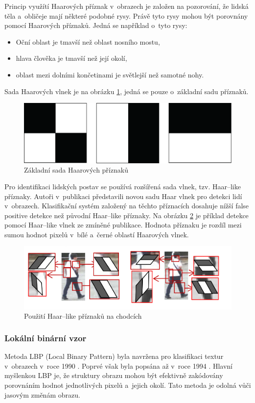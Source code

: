 Princip využítí Haarových příznak v~obrazech je založen na pozorování, že lidská těla a~obličeje mají některé podobné rysy. Právě tyto rysy mohou být porovnány pomocí Haarových příznaků. Jedná se například o~tyto rysy:
\begin{itemize}
  \item{Oční oblast je tmavší než oblast nosního mostu,}
  \item{hlava člověka je tmavší než její okolí,}
  \item{oblast mezi dolními končetinami je světlejší než samotné nohy.}
\end{itemize}
Sada Haarových vlnek je na obrázku \ref{fig:basichaarfeatures}, jedná se pouze o~základní sadu příznaků.
\begin{figure}[H]
\centering
\includegraphics[width=.7\linewidth]{figures/haar_features}
\caption{Základní sada Haarových příznaků}
\label{fig:basichaarfeatures}
\end{figure}

Pro identifikaci lidských postav se používá rozšířená sada vlnek, tzv. Haar--like příznaky. Autoři v~publikaci \cite{haar:like} představili novou sadu Haar vlnek pro detekci lidí v~obrazech. Klasifikační systém založený na těchto příznacích dosahuje nížší false positive detekce než původní Haar--like příznaky.  Na obrázku \ref{fig:haarlike} je příklad detekce pomocí Haar--like vlnek ze zmíněné publikace. Hodnota příznaku je rozdíl mezi sumou hodnot pixelů v~bílé a~černé oblastí Haarových vlnek.
\begin{figure}[H]
\centering
\includegraphics[width=.8\linewidth]{figures/haar-like}
\caption{Použití Haar--like příznaků na chodcích \cite{haar:like}}
\label{fig:haarlike}
\end{figure}

\subsubsection*{Lokální binární vzor}
Metoda LBP (Local Binary Pattern) byla navržena pro klasifikaci textur v~obrazech v~roce 1990 \cite{lbp:texture}. Poprvé však byla popsána až v~roce 1994 \cite{lbp:first}. Hlavní myšlenkou LBP je, že struktury obrazu mohou být efektivně zakódovány porovnáním hodnot jednotlivých pixelů a~jejich okolí. Tato metoda je odolná vůči jasovým změnám obrazu.

